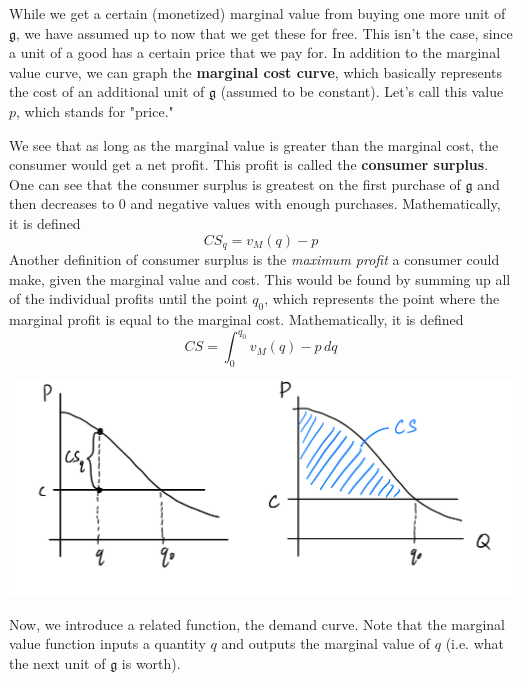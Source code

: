 \documentclass{article}
\begin{document}
    While we get a certain (monetized) marginal value from buying one more unit of $\mathfrak{g}$, we have assumed up to now that we get these for free. This isn't the case, since a unit of a good has a certain price that we pay for. In addition to the marginal value curve, we can graph the \textbf{marginal cost curve}, which basically represents the cost of an additional unit of $\mathfrak{g}$ (assumed to be constant). Let's call this value $p$, which stands for "price." 

    \begin{definition}
      We see that as long as the marginal value is greater than the marginal cost, the consumer would get a net profit. This profit is called the \textbf{consumer surplus}. One can see that the consumer surplus is greatest on the first purchase of $\mathfrak{g}$ and then decreases to $0$ and negative values with enough purchases. Mathematically, it is defined 
      \[CS_{q} = v_M (q) - p\]
      Another definition of consumer surplus is the \textit{maximum profit} a consumer could make, given the marginal value and cost. This would be found by summing up all of the individual profits until the point $q_0$, which represents the point where the marginal profit is equal to the marginal cost. Mathematically, it is defined 
      \[CS = \int_{0}^{q_0} v_M (q) - p \,dq\]
      \begin{center}
        \includegraphics[scale=0.25]{img/Consumer_Surplus_Definition.PNG}
      \end{center}
    \end{definition}

    Now, we introduce a related function, the demand curve. Note that the marginal value function inputs a quantity $q$ and outputs the marginal value of $q$ (i.e. what the next unit of $\mathfrak{g}$ is worth).
\end{document}
